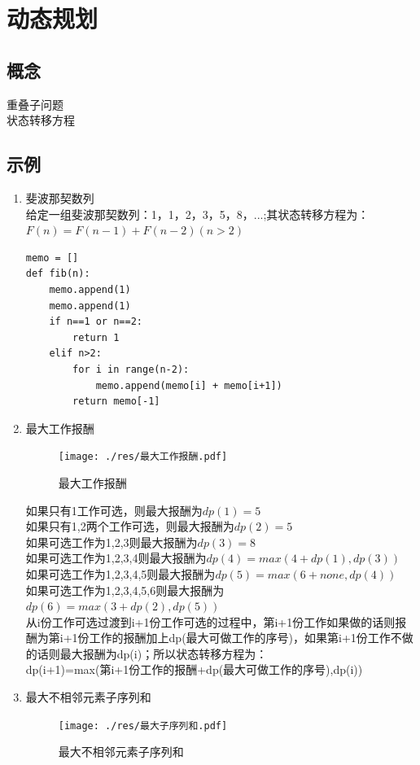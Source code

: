 \documentclass{book}
\begin{document}
\chapter{动态规划}
\section{概念}
\noindent 重叠子问题\\
状态转移方程
\section{示例}
\begin{enumerate}
\item 斐波那契数列\\
给定一组斐波那契数列：1，1，2，3，5，8，...;其状态转移方程为：$F(n)=F(n-1) + F(n-2) (n>2)$
\begin{lstlisting}
memo = []
def fib(n):
    memo.append(1)
    memo.append(1)
    if n==1 or n==2:
        return 1
    elif n>2:
        for i in range(n-2):
            memo.append(memo[i] + memo[i+1]) 
        return memo[-1]
\end{lstlisting}
\item 最大工作报酬\\
\begin{figure}[!htbp]
\centering
\caption{最大工作报酬}
\texttt{[image: ./res/最大工作报酬.pdf]}
\end{figure}

如果只有1工作可选，则最大报酬为$dp(1)=5$\\
如果只有1,2两个工作可选，则最大报酬为$dp(2)=5$\\
如果可选工作为1,2,3则最大报酬为$dp(3)=8$\\
如果可选工作为1,2,3,4则最大报酬为$dp(4)=max(4+dp(1),dp(3))$\\
如果可选工作为1,2,3,4,5则最大报酬为$dp(5)=max(6+none, dp(4))$\\
如果可选工作为1,2,3,4,5,6则最大报酬为$dp(6)=max(3+dp(2), dp(5))$\\

\setlength{\parindent}{2em} 从i份工作可选过渡到i+1份工作可选的过程中，第i+1份工作如果做的话则报酬为第i+1份工作的报酬加上dp(最大可做工作的序号)，如果第i+1份工作不做的话则最大报酬为dp(i)；所以状态转移方程为：\\
dp(i+1)=max(第i+1份工作的报酬+dp(最大可做工作的序号),dp(i))

\item 最大不相邻元素子序列和
\begin{figure}[!htbp]
\caption{最大不相邻元素子序列和}
\texttt{[image: ./res/最大子序列和.pdf]}
\centering
\end{figure}


\end{enumerate}
\end{document}
